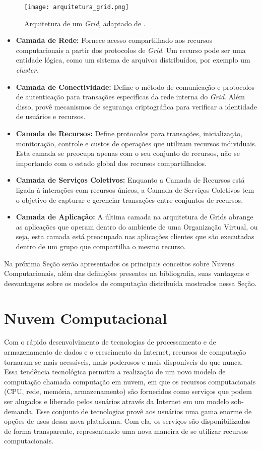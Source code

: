 \begin{figure}[h!]
	\centering
	\texttt{[image: arquitetura\_grid.png]}
	\caption{Arquitetura de um \textit{Grid}, adaptado de \cite{cloud_360}.}
	\label{fig:grid_architecture}
\end{figure}

\begin{itemize}
	\item \textbf{Camada de Rede:} Fornece acesso compartilhado aos recursos computacionais a partir dos protocolos de \textit{Grid}. Um recurso pode ser uma entidade lógica, como um sistema de arquivos distribuídos, por exemplo um \textit{cluster}.
	\item \textbf{Camada de Conectividade:} Define o método de comunicação e protocolos de autenticação para transações especifícas da rede interna do \textit{Grid}. Além disso, provê mecanismos de segurança criptográfica para verificar a identidade de usuários e recursos.
	\item \textbf{Camada de Recursos:} Define protocolos para transações, inicialização, monitoração, controle e custos de operações que utilizam recursos individuais. Esta camada se preocupa apenas com o seu conjunto de recursos, não se importando com o estado global dos recursos compartilhados.
	\item \textbf{Camada de Serviços Coletivos:} Enquanto a Camada de Recursos está ligada à interações com recursos únicos, a Camada de Serviços Coletivos tem o objetivo de capturar e gerenciar transações entre conjuntos de recursos.
	\item \textbf{Camada de Aplicação:} A última camada na arquitetura de Grids abrange as aplicações que operam dentro do ambiente de uma Organização Virtual, ou seja, esta camada está preocupada nas aplicações clientes que são executadas dentro de um grupo que compartilha o mesmo recurso.
\end{itemize}

Na próxima Seção serão apresentados os principais conceitos sobre Nuvens Computacionais, além das definições presentes na bibliografia, suas vantagens e desvantagens sobre os modelos de computação distribuída mostrados nessa Seção.

\section{Nuvem Computacional} \label{cap2sec2} 

Com o rápido desenvolvimento de tecnologias de processamento e de armazenamento de dados e o crescimento da Internet, recursos de computação tornaram-se mais acessíveis, mais poderosos e mais disponíveis do que nunca. Essa tendência tecnológica permitiu a realização de um novo modelo de computação chamada computação em nuvem, em que os recursos computacionais (CPU, rede, memória, armazenamento) são fornecidos como serviços que podem ser alugados e liberado pelos usuários através da Internet em um modelo sob-demanda. Esse conjunto de tecnologias provê aos usuários uma gama enorme de opções de usos dessa nova plataforma. Com ela, os serviços são disponibilizados de forma transparente, representando uma nova maneira de se utilizar recursos computacionais. 

